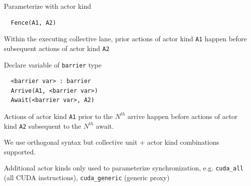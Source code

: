 \begin{minipage}[t]{0.48\textwidth}\fixminipage
{}

Parameterize with actor kind
\begin{verbatim}
  Fence(A1, A2)
\end{verbatim}
Within the executing collective lane, prior actions of actor kind \texttt{A1} happen before subsequent actions of actor kind \texttt{A2}


Declare variable of \texttt{barrier} type
\begin{verbatim}
  <barrier var> : barrier
  Arrive(A1, <barrier var>)
  Await(<barrier var>, A2)
\end{verbatim}

Actions of actor kind \texttt{A1} prior to the $N^{th}$ arrive happen before actions of actor kind \texttt{A2} subsequent to the $N^{th}$ await.

We use orthogonal syntax but  collective unit + actor kind combinations supported.


Additional actor kinds only used to parameterize synchronization,
e.g. \texttt{cuda\_all} (all CUDA instructions), \texttt{cuda\_generic} (generic proxy)

\end{minipage}

\newpage
{}

